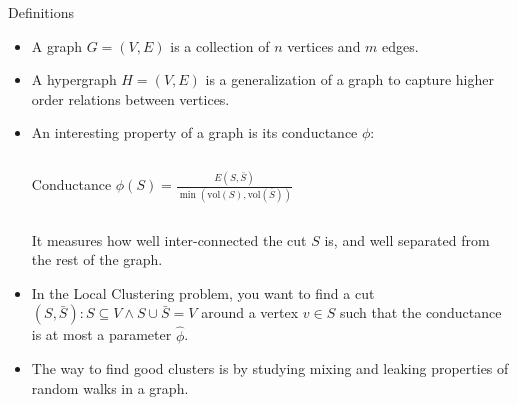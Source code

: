 \documentclass[../main.tex]{subfiles}
\begin{document}
    \begin{frame}{Definitions} 
        \begin{itemize}
            \item A graph $G=(V,E)$ is a collection of $n$ vertices and $m$ edges.
            \item A hypergraph $H=(V,E)$ is a generalization of a graph to capture higher order relations between vertices.
            \item An interesting property of a graph is its conductance $\phi$: 
	            \begin{columns}
	            	\begin{block}{Conductance}
	            		$\phi(S) = \frac{E(S, \bar{S})}{\min(\text{vol}(S), \text{vol}(\bar{S}))}$
	            	\end{block}
	            \end{columns}
            It measures how well inter-connected the cut $S$ is, and well separated from the rest of the graph.
            \item In the Local Clustering problem, you want to find a cut $(S, \bar{S}) : S\subseteq V \land S\cup \bar{S}=V$ around a vertex $v\in S$ such that the conductance is at most a parameter $\hat{\phi}$.
            \item The way to find good clusters is by studying mixing and leaking properties of random walks in a graph. 
        \end{itemize}
    \end{frame}
    
\end{document}
